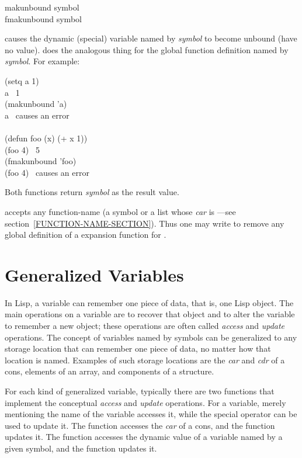 \begin{defun}[Function]
makunbound symbol \\
fmakunbound symbol

 causes the dynamic (special) variable named
by \emph{symbol} to become unbound (have no value).  
does the analogous thing for the global function definition named
by \emph{symbol}.
For example:
\begin{lisp}
(setq a 1) \\
a \EV\ 1 \\
(makunbound 'a) \\
a \EV\ \textrm{causes an error} \\
\\
(defun foo (x) (+ x 1)) \\
(foo 4) \EV\ 5 \\
(fmakunbound 'foo) \\
(foo 4) \EV\ \textrm{causes an error}
\end{lisp}
Both functions return \emph{symbol} as the result value.

accepts any function-name (a symbol or a list
whose \emph{car} is ---see section~\ref{FUNCTION-NAME-SECTION}).
Thus one may write  to remove any
global definition of a  expansion function for .
\end{defun}

\section{Generalized Variables}
\label{SETF-SECTION}
 
In Lisp, a variable can remember one piece of data,
that is, one Lisp object.
The main operations on a variable are to recover that object and
to alter the variable to remember a new object; these operations are
often called \emph{access} and \emph{update} operations.  The concept of
variables named by symbols can be generalized to any storage location
that can remember one piece of data, no matter how that location is
named.  Examples of such storage locations are the \emph{car} and \emph{cdr} of
a cons, elements of an array, and components of a structure.

For each kind of generalized variable, typically there are two functions
that implement the conceptual \emph{access} and \emph{update} operations.
For a variable, merely mentioning the name of the variable accesses it,
while the  special operator can be used to update it.
The function  accesses the \emph{car} of a cons,
and the function  updates it.
The function  accesses the dynamic value of a variable
named by a given symbol, and the function  updates it.

